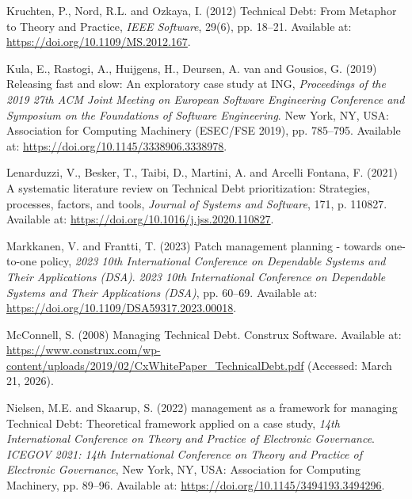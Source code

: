 \documentclass[
  12pt,
  letterpaper,
  12pt,
  oneside,
  english,
  onehalfspacing,
  headsepline]{MastersDoctoralThesis}
\newlength{\cslhangindent}
\newenvironment{CSLReferences}[2] %
 {\begin{list}{}{%
  \setlength{\itemindent}{0pt}
  \setlength{\leftmargin}{0pt}
  \setlength{\parsep}{0pt}
  \ifodd #1
   \setlength{\leftmargin}{\cslhangindent}
   \setlength{\itemindent}{-1\cslhangindent}
  \fi
  \setlength{\itemsep}{#2\baselineskip}}}
 {\end{list}}
\begin{document}
\begin{CSLReferences}{0}{1}
Kruchten, P., Nord, R.L. and Ozkaya, I. (2012)
\textquotesingle Technical {Debt}: {From Metaphor} to {Theory} and
{Practice}\textquotesingle, \emph{IEEE Software}, 29(6), pp. 18--21.
Available at: \url{https://doi.org/10.1109/MS.2012.167}.

Kula, E., Rastogi, A., Huijgens, H., Deursen, A. van and Gousios, G.
(2019) \textquotesingle Releasing fast and slow: An exploratory case
study at {ING}\textquotesingle, \emph{Proceedings of the 2019 27th {ACM
Joint Meeting} on {European Software Engineering Conference} and
{Symposium} on the {Foundations} of {Software Engineering}}. New York,
NY, USA: Association for Computing Machinery ({ESEC}/{FSE} 2019), pp.
785--795. Available at: \url{https://doi.org/10.1145/3338906.3338978}.

Lenarduzzi, V., Besker, T., Taibi, D., Martini, A. and Arcelli Fontana,
F. (2021) \textquotesingle A systematic literature review on {Technical
Debt} prioritization: {Strategies}, processes, factors, and
tools\textquotesingle, \emph{Journal of Systems and Software}, 171, p.
110827. Available at: \url{https://doi.org/10.1016/j.jss.2020.110827}.

Markkanen, V. and Frantti, T. (2023) \textquotesingle Patch management
planning - towards one-to-one policy\textquotesingle, \emph{2023 10th
{International Conference} on {Dependable Systems} and {Their
Applications} ({DSA})}. \emph{2023 10th {International Conference} on
{Dependable Systems} and {Their Applications} ({DSA})}, pp. 60--69.
Available at: \url{https://doi.org/10.1109/DSA59317.2023.00018}.

McConnell, S. (2008) \textquotesingle Managing {Technical
Debt}\textquotesingle. Construx Software. Available at:
\url{https://www.construx.com/wp-content/uploads/2019/02/CxWhitePaper_TechnicalDebt.pdf}
(Accessed: March 21, 2026).

Nielsen, M.E. and Skaarup, S. (2022) 
management as a framework for managing {Technical Debt}: {Theoretical}
framework applied on a case study\textquotesingle, \emph{14th
{International Conference} on {Theory} and {Practice} of {Electronic
Governance}}. \emph{{ICEGOV} 2021: 14th {International Conference} on
{Theory} and {Practice} of {Electronic Governance}}, New York, NY, USA:
Association for Computing Machinery, pp. 89--96. Available at:
\url{https://doi.org/10.1145/3494193.3494296}.


\end{CSLReferences}
\end{document}
